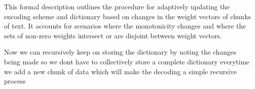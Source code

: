 \documentclass[scrartcl]{article}
\begin{document}
This formal description outlines the procedure for adaptively updating the encoding scheme and dictionary based on changes in the weight vectors of chunks of text. It accounts for scenarios where the monotonicity changes and where the sets of non-zero weights intersect or are disjoint between weight vectors.

Now we can recursively keep on storing the dictionary by noting the changes being made so we dont have to collectively store a complete dictionary everytime we add a new chunk of data which will make the decoding a simple recursive process
\end{document}
